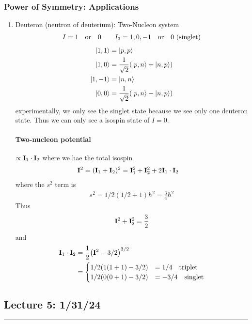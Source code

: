 \documentclass[../main.tex]{subfiles}
\begin{document}
\subsubsection*{Power of Symmetry: Applications}
\begin{enumerate}
    \item Deuteron (neutron of deuterium): Two-Nucleon system
\begin{align*}
    I = 1 \qor 0 \qquad I_3 = 1, 0, -1 \qor 0 \textrm{ (singlet)}
\end{align*}
\begin{align*}
    \ket{1,1} &= \ket{p, p} \\
    \ket{1,0} &= \frac{1}{\sqrt{2}} (\ket{p, n} + \ket{n, p}) \\
    \ket{1,-1} &= \ket{n, n} \\
    \ket{0,0} &= \frac{1}{\sqrt{2}} (\ket{p, n} - \ket{n, p})
\end{align*}
experimentally, we only see the singlet state because we see only one deuteron state. Thus we can
only see a isospin state of $I = 0$.

\paragraph{Two-nucleon potential} $\propto \vb{I}_1 \cdot \vb{I}_2$ where we hae the total isospin
\begin{align*}
    \vb{I}^2 = (\vb{I}_1 + \vb{I}_2)^2 &= \vb{I}_1^2 + \vb{I}_2^2 + 2 \vb{I}_1 \cdot \vb{I}_2
\end{align*}
where the $s^2$ term is
\begin{align*}
    s^2 = 1/2 (1/2 + 1) \hbar^2 = \frac{3}{4} \hbar^2
\end{align*}
Thus
\begin{align*}
    \vb{I}_1^2 + \vb{I}_2^2 = \frac{3}{2}
\end{align*}
and
\begin{align*}
    \vb{I}_1 \cdot \vb{I}_2 &= \frac{1}{2} \qt(\vb{I}^2 - 3/2)^{3/2} \\
    &= \begin{cases}
        1/2(1(1+1) -3/2) &= 1/4 \quad \textrm{triplet} \\
        1/2(0(0+1) -3/2) &= -3/4 \quad \textrm{singlet}
    \end{cases}
\end{align*}
\end{enumerate}

\pagebreak
\subsection*{Lecture 5: \hfill  1/31/24}
\hrule \vspace{10px}
\end{document}
